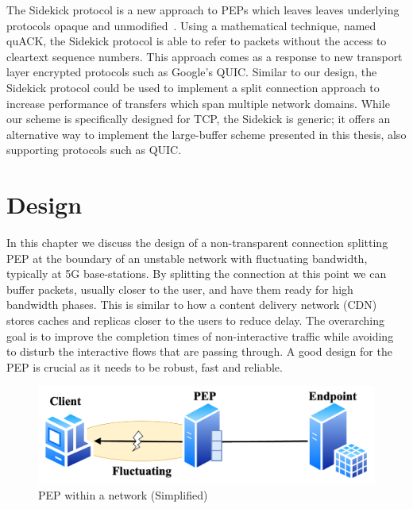 \documentclass[a4paper,english, 12pt]{report}
\begin{document}
The Sidekick protocol is a new approach to PEPs which leaves leaves underlying protocols opaque and unmodified~\cite{295691}. Using a mathematical technique, named quACK, the Sidekick protocol is able to refer to packets without the access to cleartext sequence numbers. This approach comes as a response to new transport layer encrypted protocols such as Google's QUIC. Similar to our design, the Sidekick protocol could be used to implement a split connection approach to increase performance of transfers which span multiple network domains. While our scheme is specifically designed for TCP, the Sidekick is generic; it offers an alternative way to implement the large-buffer scheme presented in this thesis, also supporting protocols such as QUIC.\\

\chapter{Design} %
In this chapter we discuss the design of a non-transparent connection splitting PEP at the boundary of an unstable network with fluctuating bandwidth, typically at 5G base-stations. By splitting the connection at this point we can buffer packets, usually closer to the user, and have them ready for high bandwidth phases. This is similar to how a content delivery network (CDN) stores caches and replicas closer to the users to reduce delay. The overarching goal is to improve the completion times of non-interactive traffic while avoiding to disturb the interactive flows that are passing through. A good design for the PEP is crucial as it needs to be robust, fast and reliable. \\

\begin{figure} %
	\centering
	\includegraphics[scale=0.45]{../diagrams/drawio/simple_pep_design.png}
  	\caption{PEP within a network (Simplified)}
  	\label{fig:simple_pep_design}
\end{figure}
\end{document}
